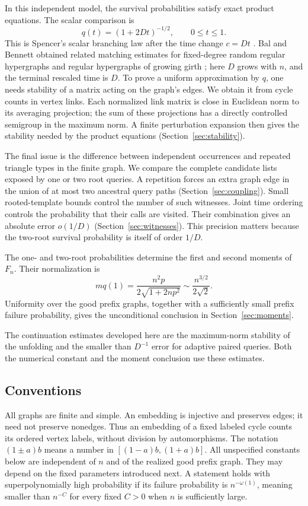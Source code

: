 In this independent model, the survival probabilities satisfy exact
product equations. The scalar comparison is
\[
 q(t)=(1+2Dt)^{-1/2},\qquad 0\le t\le1.
\]
This is Spencer's scalar branching law after the time change $c=Dt$
\cite[Section~3, equation~(9)]{Spencer1995}. Bal and Bennett obtained
related matching estimates for fixed-degree random regular hypergraphs
and regular hypergraphs of growing girth
\cite[Corollaries~3--4]{BalBennett2023}; here $D$ grows with $n$,
and the terminal rescaled time is $D$.
To prove a uniform approximation by $q$, one needs stability of a matrix
acting on the graph's edges. We obtain it from cycle counts in vertex
links. Each normalized link matrix is close in Euclidean norm to its
averaging projection; the sum of these projections has a directly
controlled semigroup in the maximum norm. A finite perturbation expansion
then gives the stability needed by the product equations
(Section~\ref{sec:stability}).

The final issue is the difference between independent occurrences and
repeated triangle types in the finite graph. We compare the complete
candidate lists exposed by one or two root queries. A repetition forces
an extra graph edge in the union of at most two ancestral query paths
(Section~\ref{sec:coupling}). Small rooted-template bounds control the
number of such witnesses. Joint time ordering controls the probability
that their calls are visited. Their combination gives an absolute error
$o(1/D)$ (Section~\ref{sec:witnesses}). This precision matters because the
two-root survival probability is itself of order $1/D$.

The one- and two-root probabilities determine the first and second
moments of $F_n$. Their normalization is
\[
 mq(1)=\frac{n^2p}{2\sqrt{1+2np^2}}
       \sim\frac{n^{3/2}}{2\sqrt2}.
\]
Uniformity over the good prefix graphs, together with a sufficiently
small prefix failure probability, gives the unconditional conclusion
in Section~\ref{sec:moments}.

The continuation estimates developed here are the maximum-norm stability
of the unfolding and the smaller than $D^{-1}$ error for adaptive paired
queries. Both the numerical constant and the moment conclusion use
these estimates.

\subsection{Conventions}

All graphs are finite and simple. An embedding is injective and preserves
edges; it need not preserve nonedges. Thus an embedding of a fixed labeled
cycle counts its ordered vertex labels, without division by automorphisms.
The notation $(1\pm a)b$ means a number in $[(1-a)b,(1+a)b]$.
All unspecified constants below are independent of $n$ and of the realized
good prefix graph. They may depend on the fixed parameters introduced
next. A statement holds with superpolynomially high probability if its
failure probability is $n^{-\omega(1)}$, meaning smaller than $n^{-C}$
for every fixed $C>0$ when $n$ is sufficiently large.
